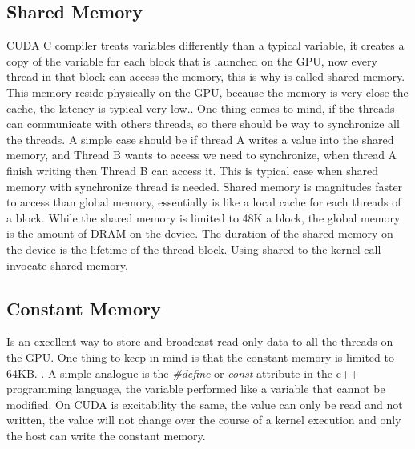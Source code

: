 

\subsection{Shared Memory}

CUDA C compiler treats variables differently than a typical variable, it creates a copy of the variable for each block that is launched on the GPU, now every thread in that block can access the memory, this is why is called shared memory. This memory reside physically on the GPU, because the memory is very close the cache, the latency is typical very low.\cite{example}. One thing comes to mind, if the threads can communicate with others threads, so there should be way to synchronize all the threads. A simple case should be if thread A writes a value into the shared memory, and Thread B wants to access we need to synchronize, when thread A finish writing then Thread B can access it. This is typical case when shared memory with synchronize thread is needed. \cite{cook}
Shared memory is magnitudes faster to access than global memory, essentially is like a local cache for each threads of a block. While  the shared memory is limited to 48K a block, the global memory is the amount of DRAM on the device. The duration of the shared memory on the device is the lifetime of the thread block. Using \twoline shared \twoline to the kernel call invocate shared memory.


\subsection{Constant Memory}

Is an excellent way to store and broadcast read-only data to all the threads on the GPU. One thing to keep in mind is that the constant memory is limited to 64KB. \cite{design}. A simple analogue is the  \textit{\#define} or \textit{const} attribute in the c++ programming language, the variable performed like a variable that cannot be modified. On CUDA is  excitability the same, the value can only be read and not written, the value will not change over the course of a kernel execution and only the host can write the constant memory.\cite{example}

